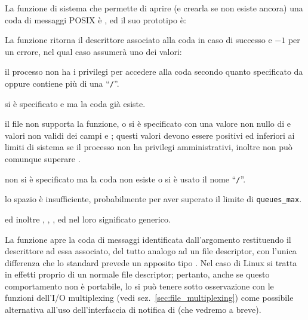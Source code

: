 La funzione di sistema che permette di aprire (e crearla se non esiste ancora)
una coda di messaggi POSIX è , ed il suo prototipo è:

\begin{funcproto}{

}

{La funzione ritorna il descrittore associato alla coda in caso di successo e
  $-1$ per un errore, nel qual caso  assumerà uno dei valori:
  \begin{errlist}
  \item[\errcode{EACCES}] il processo non ha i privilegi per accedere alla
    coda secondo quanto specificato da  oppure 
    contiene più di una ``\texttt{/}''.
  \item[\errcode{EEXIST}] si è specificato  e 
    ma la coda già esiste.
  \item[\errcode{EINVAL}] il file non supporta la funzione, o si è specificato
     con una valore non nullo di  e valori non
    validi dei campi  e ; questi valori
    devono essere positivi ed inferiori ai limiti di sistema se il processo
    non ha privilegi amministrativi, inoltre  non può comunque
    superare .
  \item[\errcode{ENOENT}] non si è specificato  ma la coda non
    esiste o si è usato il nome ``\texttt{/}''.
  \item[\errcode{ENOSPC}] lo spazio è insufficiente, probabilmente per aver
    superato il limite di \texttt{queues\_max}.
  \end{errlist}
  ed inoltre , , ,
   ed nel loro significato generico.  }
\end{funcproto}

La funzione apre la coda di messaggi identificata dall'argomento 
restituendo il descrittore ad essa associato, del tutto analogo ad un file
descriptor, con l'unica differenza che lo standard prevede un apposito tipo
. Nel caso di Linux si tratta in effetti proprio di un normale
file descriptor; pertanto, anche se questo comportamento non è portabile, lo
si può tenere sotto osservazione con le funzioni dell'I/O multiplexing (vedi
sez.~\ref{sec:file_multiplexing}) come possibile alternativa all'uso
dell'interfaccia di notifica di  (che vedremo a breve).

